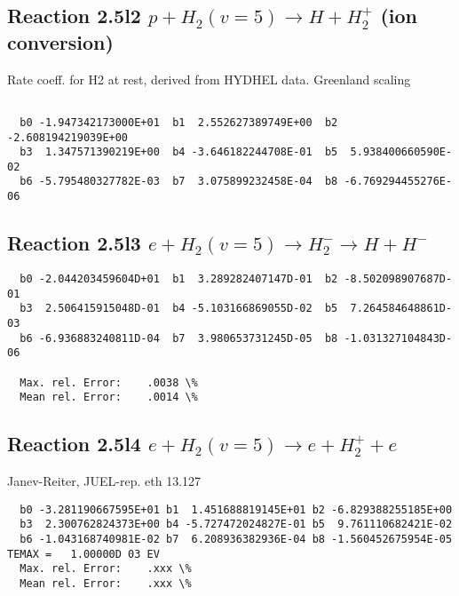 \documentclass[12pt,dvipdfmx]{article}
\begin{document}
\subsection{
Reaction 2.5l2
$ p + H_2(v=5) \rightarrow H + H_2^+$ (ion conversion)
}
Rate coeff. for H2 at rest, derived from HYDHEL data. Greenland scaling


\begin{small}\begin{verbatim}

  b0 -1.947342173000E+01  b1  2.552627389749E+00  b2 -2.608194219039E+00
  b3  1.347571390219E+00  b4 -3.646182244708E-01  b5  5.938400660590E-02
  b6 -5.795480327782E-03  b7  3.075899232458E-04  b8 -6.769294455276E-06

\end{verbatim}\end{small}

\newpage

\subsection{
Reaction 2.5l3
 $ e + H_2(v=5) \rightarrow H_2^- \rightarrow H + H^-$
}


\begin{small}\begin{verbatim}
  b0 -2.044203459604D+01  b1  3.289282407147D-01  b2 -8.502098907687D-01
  b3  2.506415915048D-01  b4 -5.103166869055D-02  b5  7.264584648861D-03
  b6 -6.936883240811D-04  b7  3.980653731245D-05  b8 -1.031327104843D-06

  Max. rel. Error:    .0038 \%
  Mean rel. Error:    .0014 \%

\end{verbatim}\end{small}

\subsection{
Reaction 2.5l4
 $ e + H_2(v=5) \rightarrow e + H_2^+  + e $
}
Janev-Reiter, JUEL-rep. eth 13.127

\begin{small}\begin{verbatim}
  b0 -3.281190667595E+01 b1  1.451688819145E+01 b2 -6.829388255185E+00
  b3  2.300762824373E+00 b4 -5.727472024827E-01 b5  9.761110682421E-02
  b6 -1.043168740981E-02 b7  6.208936382936E-04 b8 -1.560452675954E-05
TEMAX =   1.00000D 03 EV
  Max. rel. Error:    .xxx \%
  Mean rel. Error:    .xxx \%
\end{verbatim}\end{small}
\end{document}
